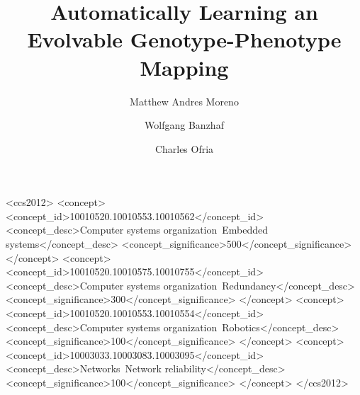 \documentclass[sigconf, authordraft]{acmart}
\begin{document}
\title{Automatically Learning an Evolvable Genotype-Phenotype Mapping}

  \author{Matthew Andres Moreno}

  \author{Wolfgang Banzhaf}

  \author{Charles Ofria}

\begin{abstract}
  
\end{abstract}

%
%
\begin{CCSXML}
<ccs2012>
 <concept>
  <concept_id>10010520.10010553.10010562</concept_id>
  <concept_desc>Computer systems organization~Embedded systems</concept_desc>
  <concept_significance>500</concept_significance>
 </concept>
 <concept>
  <concept_id>10010520.10010575.10010755</concept_id>
  <concept_desc>Computer systems organization~Redundancy</concept_desc>
  <concept_significance>300</concept_significance>
 </concept>
 <concept>
  <concept_id>10010520.10010553.10010554</concept_id>
  <concept_desc>Computer systems organization~Robotics</concept_desc>
  <concept_significance>100</concept_significance>
 </concept>
 <concept>
  <concept_id>10003033.10003083.10003095</concept_id>
  <concept_desc>Networks~Network reliability</concept_desc>
  <concept_significance>100</concept_significance>
 </concept>
</ccs2012>
\end{CCSXML}





\maketitle





\end{document}
